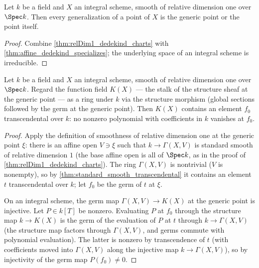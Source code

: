 \begin{theorem}
  \label{thm:relDim1_specializes}
  \leanok
  Let \(k\) be a field and \(X\) an integral scheme, smooth of relative dimension one over
  \(\Spec k\). Then every generalization of a point of \(X\) is the generic point or the
  point itself.
\end{theorem}
\begin{proof}
  \leanok
  Combine \ref{thm:relDim1_dedekind_charts} with \ref{thm:affine_dedekind_specializes};
  the underlying space of an integral scheme is irreducible.
\end{proof}

\begin{theorem}
  \label{thm:relDim1_transcendental}
  \leanok
  Let \(k\) be a field and \(X\) an integral scheme, smooth of relative dimension one over
  \(\Spec k\). Regard the function field \(K(X)\) --- the stalk of the structure sheaf at
  the generic point --- as a ring under \(k\) via the structure morphism (global sections
  followed by the germ at the generic point). Then \(K(X)\) contains an element \(f_0\)
  transcendental over \(k\): no nonzero polynomial with coefficients in \(k\) vanishes at
  \(f_0\).
\end{theorem}
\begin{proof}
  \leanok
  Apply the definition of smoothness of relative dimension one at the generic point
  \(\xi\): there is an affine open \(V \ni \xi\) such that \(k \to \Gamma(X, V)\) is
  standard smooth of relative dimension \(1\) (the base affine open is all of \(\Spec k\),
  as in the proof of \ref{thm:relDim1_dedekind_charts}). The ring \(\Gamma(X, V)\) is
  nontrivial (\(V\) is nonempty), so by \ref{thm:standard_smooth_transcendental} it
  contains an element \(t\) transcendental over \(k\); let \(f_0\) be the germ of \(t\) at
  \(\xi\).

  On an integral scheme, the germ map \(\Gamma(X, V) \to K(X)\) at the generic point is
  injective. Let \(P \in k[T]\) be nonzero. Evaluating \(P\) at \(f_0\) through the
  structure map \(k \to K(X)\) is the germ of the evaluation of \(P\) at \(t\) through
  \(k \to \Gamma(X, V)\) (the structure map factors through \(\Gamma(X, V)\), and germs
  commute with polynomial evaluation). The latter is nonzero by transcendence of \(t\)
  (with coefficients moved into \(\Gamma(X, V)\) along the injective map \(k \to
  \Gamma(X, V)\)), so by injectivity of the germ map \(P(f_0) \neq 0\).
\end{proof}

